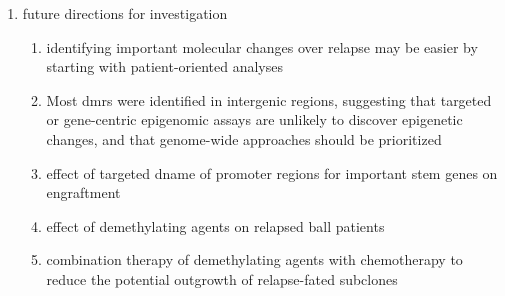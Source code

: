 \begin{enumerate}
  \item future directions for investigation
  \begin{enumerate}
    \item identifying important molecular changes over relapse may be easier by starting with patient-oriented analyses
    \item Most \glspl{dmr} were identified in intergenic regions, suggesting that targeted or gene-centric epigenomic assays are unlikely to discover epigenetic changes, and that genome-wide approaches should be prioritized
    \item effect of targeted \gls{dname} of promoter regions for important stem genes on engraftment
    \item effect of demethylating agents on relapsed \gls{ball} patients
    \item combination therapy of demethylating agents with chemotherapy to reduce the potential outgrowth of relapse-fated subclones
  \end{enumerate}
\end{enumerate}